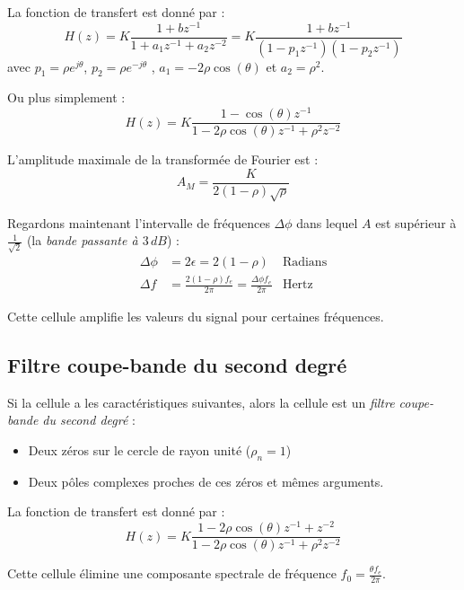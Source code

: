             La fonction de transfert est donné par :
            $$
                H(z) = K \frac{1 + bz^{-1}}{1 + a_1z^{-1} + a_2z^{-2}} = K \frac{1 + bz^{-1}}{(1-p_1z^{-1})(1 - p_2z^{-1})}
            $$
            avec $p_1 = \rho e^{j\theta}$, $p_2 = \rho e^{-j\theta}$ , $a_1 = -2\rho\cos(\theta)$ et $a_2 = \rho^2$.

            Ou plus simplement :
            $$
                H(z) = K \frac{1 - \cos(\theta)z^{-1}}{1 - 2\rho\cos(\theta)z^{-1} + \rho^2z^{-2}}
            $$

            L'amplitude maximale de la transformée de Fourier est :
            $$
                A_M = \frac{K}{2(1-\rho)\sqrt{\rho}}
            $$

            Regardons maintenant l'intervalle de fréquences $\Delta\phi$ dans lequel $A$ est supérieur à $\frac{1}{\sqrt{2}}$ (la \textit{bande passante à $3\,dB$}) :
            \begin{align*}
                \Delta\phi &= 2\epsilon = 2(1-\rho) & \text{Radians}\\
                \Delta f &= \frac{2(1-\rho) f_e}{2\pi} = \frac{\Delta\phi f_e}{2\pi} & \text{Hertz}
            \end{align*}

            Cette cellule amplifie les valeurs du signal pour certaines fréquences.

        \subsection{Filtre coupe-bande du second degré}
            Si la cellule a les caractéristiques suivantes, alors la cellule est un \textit{filtre coupe-bande du second degré} :
            \begin{itemize}
                \item Deux zéros sur le cercle de rayon unité ($\rho_n = 1$)
                \item Deux pôles complexes proches de ces zéros et mêmes arguments.
            \end{itemize}

            La fonction de transfert est donné par :
            $$
                H(z) = K \frac{1 - 2\rho\cos(\theta)z^{-1} + z^{-2}}{1 - 2\rho\cos(\theta)z^{-1} + \rho^2z^{-2}}
            $$

            Cette cellule élimine une composante spectrale de fréquence $f_0 = \frac{\theta f_e}{2\pi}$.

